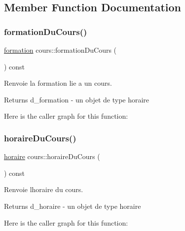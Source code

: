 \subsection{Member Function Documentation}
\hypertarget{classcours_a6f2b466ed292ca0152a90c34509be8af}{}\label{classcours_a6f2b466ed292ca0152a90c34509be8af} 
\subsubsection{\texorpdfstring{formation\+Du\+Cours()}{formationDuCours()}}
{\footnotesize\ttfamily \hyperlink{classformation}{formation} cours\+::formation\+Du\+Cours (\begin{DoxyParamCaption}{ }\end{DoxyParamCaption}) const}



Renvoie la formation lie a un cours. 

\begin{DoxyReturn}{Returns}
d\+\_\+formation -\/ un objet de type horaire 
\end{DoxyReturn}
Here is the caller graph for this function\+:
\hypertarget{classcours_af09cffcbd77d17a2100bdacf0f1fb2a9}{}\label{classcours_af09cffcbd77d17a2100bdacf0f1fb2a9} 
\subsubsection{\texorpdfstring{horaire\+Du\+Cours()}{horaireDuCours()}}
{\footnotesize\ttfamily \hyperlink{classhoraire}{horaire} cours\+::horaire\+Du\+Cours (\begin{DoxyParamCaption}{ }\end{DoxyParamCaption}) const}



Renvoie l\textquotesingle{}horaire du cours. 

\begin{DoxyReturn}{Returns}
d\+\_\+horaire -\/ un objet de type horaire 
\end{DoxyReturn}
Here is the caller graph for this function\+:
\hypertarget{classcours_a84b7b5ac9221a3edcaf142c8b28152cb}{}\label{classcours_a84b7b5ac9221a3edcaf142c8b28152cb} 
